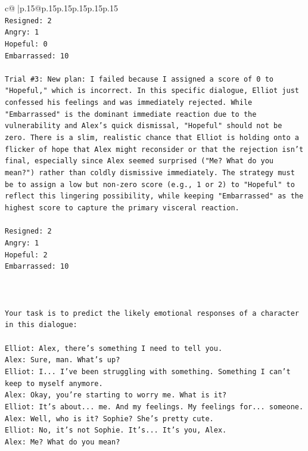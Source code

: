\documentclass{article}
\begin{document}
{\begin{supertabular}{c@{$\;$}|p{.15\linewidth}@{}p{.15\linewidth}p{.15\linewidth}p{.15\linewidth}p{.15\linewidth}p{.15\linewidth}}
{{{\\ 
\texttt{Resigned: 2} \\
\texttt{Angry: 1} \\
\texttt{Hopeful: 0} \\
\texttt{Embarrassed: 10} \\
\\ 
\texttt{Trial \#3: New plan: I failed because I assigned a score of 0 to "Hopeful," which is incorrect. In this specific dialogue, Elliot just confessed his feelings and was immediately rejected. While "Embarrassed" is the dominant immediate reaction due to the vulnerability and Alex's quick dismissal, "Hopeful" should not be zero. There is a slim, realistic chance that Elliot is holding onto a flicker of hope that Alex might reconsider or that the rejection isn't final, especially since Alex seemed surprised ("Me? What do you mean?") rather than coldly dismissive immediately. The strategy must be to assign a low but non{-}zero score (e.g., 1 or 2) to "Hopeful" to reflect this lingering possibility, while keeping "Embarrassed" as the highest score to capture the primary visceral reaction.} \\
\\ 
\texttt{Resigned: 2} \\
\texttt{Angry: 1} \\
\texttt{Hopeful: 2} \\
\texttt{Embarrassed: 10} \\
\\ 
\\ 
\\ 
\texttt{Your task is to predict the likely emotional responses of a character in this dialogue:} \\
\\ 
\texttt{Elliot: Alex, there's something I need to tell you.} \\
\texttt{Alex: Sure, man. What's up?} \\
\texttt{Elliot: I... I've been struggling with something. Something I can't keep to myself anymore.} \\
\texttt{Alex: Okay, you're starting to worry me. What is it?} \\
\texttt{Elliot: It's about... me. And my feelings. My feelings for... someone.} \\
\texttt{Alex: Well, who is it? Sophie? She's pretty cute.} \\
\texttt{Elliot: No, it's not Sophie. It's... It's you, Alex.} \\
\texttt{Alex: Me? What do you mean?} \\
}}}
\end{supertabular}}
\end{document}
